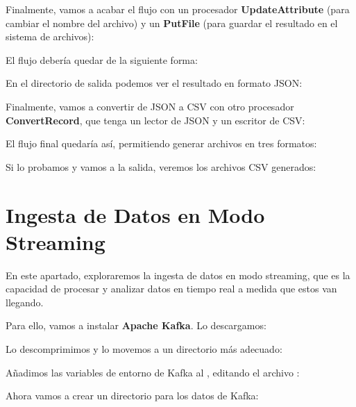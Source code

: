 \documentclass{../../miPlantilla}
\begin{document}

Finalmente, vamos a acabar el flujo con un procesador \textbf{UpdateAttribute} (para cambiar el nombre del archivo) y un \textbf{PutFile} (para guardar el resultado en el sistema de archivos):


\newpage

El flujo debería quedar de la siguiente forma:


En el directorio de salida podemos ver el resultado en formato JSON:


Finalmente, vamos a convertir de JSON a CSV con otro procesador \textbf{ConvertRecord}, que tenga un lector de JSON y un escritor de CSV:


El flujo final quedaría así, permitiendo generar archivos en tres formatos:


Si lo probamos y vamos a la salida, veremos los archivos CSV generados:


\newpage

\section{Ingesta de Datos en Modo Streaming}
En este apartado, exploraremos la ingesta de datos en modo streaming, que es la capacidad de procesar y analizar datos en tiempo real a medida que estos van llegando.

Para ello, vamos a instalar \textbf{Apache Kafka}. Lo descargamos:


Lo descomprimimos y lo movemos a un directorio más adecuado:


Añadimos las variables de entorno de Kafka al , editando el archivo :


Ahora vamos a crear un directorio para los datos de Kafka:


\newpage
\end{document}
